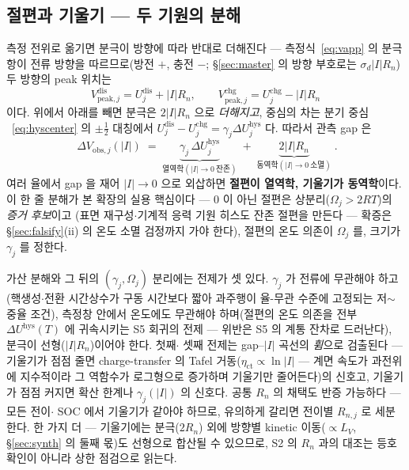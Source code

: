 \documentclass[11pt,a4paper]{article}
\newcommand{\peak}{\mathrm{peak}}
\newcommand{\dis}{\mathrm{dis}}
\newcommand{\chg}{\mathrm{chg}}
\newcommand{\hys}{\mathrm{hys}}
\newcommand{\obs}{\mathrm{obs}}
\begin{document}
\subsection{절편과 기울기 — 두 기원의 분해}
측정 전위로 옮기면 분극이 방향에 따라 반대로 더해진다 — 측정식~\eqref{eq:vapp} 의 분극 항이 전류
방향을 따르므로(방전 $+$, 충전 $-$; \S\ref{sec:master} 의 방향 부호로는 $\sigma_d|I|R_n$) 두 방향의
peak 위치는
\begin{equation}
V_{\peak,j}^{\dis}=U_j^{\dis}+|I|R_n,\qquad
V_{\peak,j}^{\chg}=U_j^{\chg}-|I|R_n
\label{eq:hyspeakpos}
\end{equation}
이다. 위에서 아래를 빼면 분극은 $2|I|R_n$ 으로 \emph{더해지고}, 중심의 차는 분기 중심
~\eqref{eq:hyscenter} 의 $\pm\tfrac12$ 대칭에서 $U_j^{\dis}-U_j^{\chg}=\gamma_j\Delta U_j^\hys$
다. 따라서 관측 gap 은
\begin{equation}
\boxed{\;\Delta V_{\obs,j}(|I|)\;=\;
\underbrace{\gamma_j\,\Delta U_j^\hys}_{\text{열역학}(|I|\to0\ \text{잔존})}
\;+\;\underbrace{2|I|R_n}_{\text{동역학}(|I|\to0\ \text{소멸})}\;.}
\label{eq:hysobsgap}
\end{equation}
여러 율에서 gap 을 재어 $|I|\to0$ 으로 외삽하면 \textbf{절편이 열역학, 기울기가 동역학}이다. 이 한 줄
분해가 본 확장의 실용 핵심이다 — $0$ 이 아닌 절편은 상분리($\Omega_j>2RT$)의 \emph{증거 후보}이고
(표면 재구성$\cdot$기계적 응력 기원 히스도 잔존 절편을 만든다 — 확증은 \S\ref{sec:falsify}(ii) 의
온도 소멸 검정까지 가야 한다), 절편의 온도 의존이 $\Omega_j$ 를, 크기가 $\gamma_j$ 를 정한다.

가산 분해와 그 뒤의 $(\gamma_j,\Omega_j)$ 분리에는 전제가 셋 있다. $\gamma_j$ 가 전류에 무관해야
하고(핵생성$\cdot$전환 시간상수가 구동 시간보다 짧아 과주행이 율-무관 수준에 고정되는 저$\sim$중율
조건), 측정창 안에서 온도에도 무관해야 하며(절편의 온도 의존을 전부 $\Delta U^\hys(T)$ 에 귀속시키는
S5 회귀의 전제 — 위반은 S5 의 계통 잔차로 드러난다), 분극이 선형($|I|R_n$)이어야 한다. 첫째$\cdot$
셋째 전제는 gap--$|I|$ 곡선의 \emph{휨}으로 검출된다 — 기울기가 점점 줄면 charge-transfer 의 Tafel 거동($\eta_{\mathrm{ct}}\propto\ln|I|$ — 계면
속도가 과전위에 지수적이라 그 역함수가 로그형으로 증가하며 기울기만 줄어든다)의 신호고, 기울기가 점점
커지면 확산 한계나 $\gamma_j(|I|)$ 의 신호다. 공통 $R_n$ 의 채택도 반증 가능하다 — 모든 전이$\cdot$
SOC 에서 기울기가 같아야 하므로, 유의하게 갈리면 전이별 $R_{n,j}$ 로 세분한다. 한 가지 더 — 기울기에는
분극($2R_n$) 외에 방향별 kinetic 이동($\propto L_V$, \S\ref{sec:synth} 의 둘째 몫)도 선형으로 합산될
수 있으므로, S2 의 $R_n$ 과의 대조는 등호 확인이 아니라 상한 점검으로 읽는다.
\end{document}
